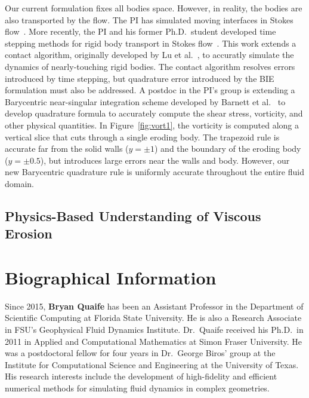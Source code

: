 \documentclass[11pt]{article}
\begin{document}
Our current formulation fixes all bodies space.  However, in reality,
the bodies are also transported by the flow.  The PI has simulated
moving interfaces in Stokes flow~\cite{qua-bir2015b, qua-bir2014,
qua-bir2016}. More recently, the PI and his former Ph.D.~student
developed time stepping methods for rigid body transport in Stokes
flow~\cite{bys-sha-qua2018}.  This work extends a contact algorithm,
originally developed by Lu et al.~\cite{lu-rah-zor2017}, to accuratly
simulate the dynamics of nearly-touching rigid bodies.  The contact
algorithm resolves errors introduced by time stepping, but quadrature
error introduced by the BIE formulation must also be addressed.  A
postdoc in the PI's group is extending a Barycentric near-singular
integration scheme developed by Barnett et al.~\cite{bar-wu-vee2015} to
develop quadrature formula to accurately compute the shear stress,
vorticity, and other physical quantities.  In Figure~\ref{fig:vort1},
the vorticity is computed along a vertical slice that cuts through a
single eroding body.  The trapezoid rule is accurate far from the solid
walls ($y = \pm 1$) and the boundary of the eroding body ($y = \pm
0.5$), but introduces large errors near the walls and body.  However,
our new Barycentric quadrature rule is uniformly accurate throughout the
entire fluid domain.


\subsection{Physics-Based Understanding of Viscous Erosion}

\section{Biographical Information}
Since 2015, {\bf Bryan Quaife} has been an Assistant Professor in the
Department of Scientific Computing at Florida State University.  He is
also a Research Associate in FSU's Geophysical Fluid Dynamics Institute.
Dr.~Quaife received his Ph.D.~in 2011 in Applied and Computational
Mathematics at Simon Fraser University.  He was a postdoctoral fellow
for four years in Dr.~George Biros' group at the Institute for
Computational Science and Engineering at the University of Texas.  His
research interests include the development of  high-fidelity and
efficient numerical methods for simulating fluid dynamics in complex
geometries.
\end{document}
